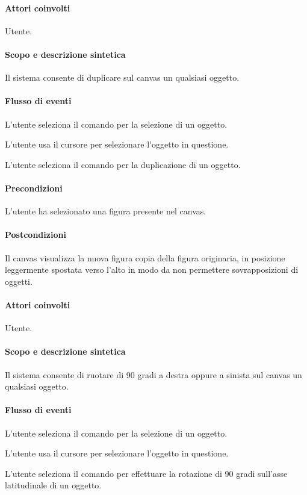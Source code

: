 \paragraph{Attori coinvolti} Utente.
\paragraph{Scopo e descrizione sintetica} Il sistema consente di duplicare sul canvas un qualsiasi oggetto.
\paragraph{Flusso di eventi}
\begin{elenconumerato}[\textbf{}]{\subsubsecindent}
\item  L'utente seleziona il comando per la selezione di un oggetto.
\item  L'utente usa il cursore per selezionare l'oggetto in questione.
\item  L'utente seleziona il comando per la duplicazione di un oggetto.
\end{elenconumerato}
\paragraph{Precondizioni} L'utente ha selezionato una figura presente nel canvas.
\paragraph{Postcondizioni} Il canvas visualizza la nuova figura copia della figura originaria, in posizione leggermente spostata verso l'alto in modo da non permettere sovrapposizioni di oggetti.

\paragraph{Attori coinvolti} Utente.
\paragraph{Scopo e descrizione sintetica} Il sistema consente di ruotare di 90 gradi a destra oppure a sinista sul canvas un qualsiasi oggetto.
\paragraph{Flusso di eventi}
\begin{elenconumerato}[\textbf{}]{\subsubsecindent}
\item  L'utente seleziona il comando per la selezione di un oggetto.
\item  L'utente usa il cursore per selezionare l'oggetto in questione.
\item  L'utente seleziona il comando per effettuare la rotazione di 90 gradi sull'asse latitudinale di un oggetto.
\end{elenconumerato}

